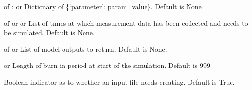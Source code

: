 \documentclass[letterpaper,10pt,english]{sphinxmanual}
\begin{document}
\begin{fulllineitems}
\begin{fulllineitems}
\end{fulllineitems}


\begin{fulllineitems}
\label{\detokenize{bcmdModel:bayescmd.bcmdModel.bcmd_model.ModelBCMD.params}}
 of :  or  \textendash{} Dictionary of \{‘parameter’: param\_value\}. Default is None

\end{fulllineitems}


\begin{fulllineitems}
\label{\detokenize{bcmdModel:bayescmd.bcmdModel.bcmd_model.ModelBCMD.times}}
 of  or  or  \textendash{} List of times at which measurement data has been collected and needs
to be simulated. Default is None.

\end{fulllineitems}


\begin{fulllineitems}
\label{\detokenize{bcmdModel:bayescmd.bcmdModel.bcmd_model.ModelBCMD.outputs}}
 of  or  \textendash{} List of model outputs to return. Default is None.

\end{fulllineitems}


\begin{fulllineitems}
\label{\detokenize{bcmdModel:bayescmd.bcmdModel.bcmd_model.ModelBCMD.burn_in}}
 or  \textendash{} Length of burn in period at start of the simulation. Default is 999

\end{fulllineitems}


\begin{fulllineitems}
\label{\detokenize{bcmdModel:bayescmd.bcmdModel.bcmd_model.ModelBCMD.create_input}}
 \textendash{} Boolean indicator as to whether an input file needs creating. Default
is True.


\end{fulllineitems}
\end{fulllineitems}
\end{document}

